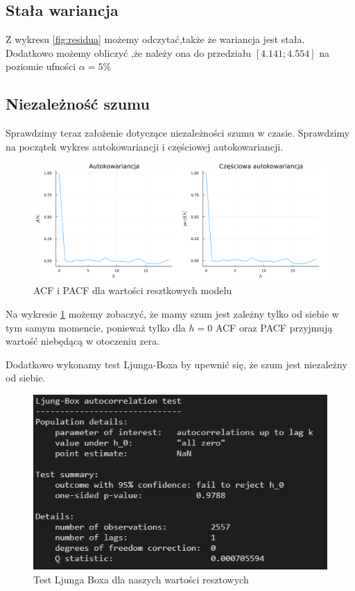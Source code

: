 \documentclass[12pt]{article}
\theoremstyle{exer}
\begin{document}
\subsection{Stała wariancja}
Z wykresu \ref{fig:residua} możemy odczytać,także że wariancja jest stała. Dodatkowo możemy obliczyć ,że  należy ona do przedziału $[4.141 ; 4.554]$ na poziomie ufności $\alpha = 5\%$

\subsection{Niezależność szumu}
Sprawdzimy teraz założenie dotyczące niezależności szumu w czasie. Sprawdzimy na początek wykres autokowariancji i częściowej autokowariancji. 
\begin{figure}[H]
	\centering
	\includegraphics[width=3\columnwidth/4]{img/acf_pacf_residua.png}
	\caption{ACF i PACF dla wartości resztkowych modelu}
	\label{fig:residua_acf_pacf}
\end{figure}
Na wykresie \ref{fig:residua_acf_pacf} możemy  zobaczyć, że mamy szum jest zależny tylko od siebie w tym samym momencie, ponieważ tylko dla $h=0$ ACF oraz PACF przyjmują wartość niebędącą w otoczeniu zera.

Dodatkowo wykonamy test Ljunga-Boxa by upewnić się, że szum jest niezależny od siebie. 
\begin{figure}[H]
	\centering
	\includegraphics[width=3\columnwidth/4]{img/Ljung-Box.png}
	\caption{Test Ljunga Boxa dla naszych wartości resztowych}
	\label{Test Ljunga Boxa}
\end{figure}
\end{document}
